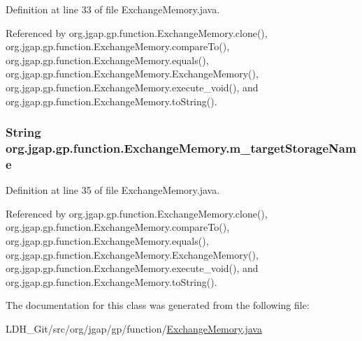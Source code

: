 Definition at line 33 of file Exchange\-Memory.\-java.



Referenced by org.\-jgap.\-gp.\-function.\-Exchange\-Memory.\-clone(), org.\-jgap.\-gp.\-function.\-Exchange\-Memory.\-compare\-To(), org.\-jgap.\-gp.\-function.\-Exchange\-Memory.\-equals(), org.\-jgap.\-gp.\-function.\-Exchange\-Memory.\-Exchange\-Memory(), org.\-jgap.\-gp.\-function.\-Exchange\-Memory.\-execute\-\_\-void(), and org.\-jgap.\-gp.\-function.\-Exchange\-Memory.\-to\-String().

\hypertarget{classorg_1_1jgap_1_1gp_1_1function_1_1_exchange_memory_aa65bd98ffa825ffc64636d27227c7d51}{
\subsubsection[{m\-\_\-target\-Storage\-Name}]{\setlength{\rightskip}{0pt plus 5cm}String org.\-jgap.\-gp.\-function.\-Exchange\-Memory.\-m\-\_\-target\-Storage\-Name\hspace{0.3cm}{\ttfamily [private]}}}\label{classorg_1_1jgap_1_1gp_1_1function_1_1_exchange_memory_aa65bd98ffa825ffc64636d27227c7d51}


Definition at line 35 of file Exchange\-Memory.\-java.



Referenced by org.\-jgap.\-gp.\-function.\-Exchange\-Memory.\-clone(), org.\-jgap.\-gp.\-function.\-Exchange\-Memory.\-compare\-To(), org.\-jgap.\-gp.\-function.\-Exchange\-Memory.\-equals(), org.\-jgap.\-gp.\-function.\-Exchange\-Memory.\-Exchange\-Memory(), org.\-jgap.\-gp.\-function.\-Exchange\-Memory.\-execute\-\_\-void(), and org.\-jgap.\-gp.\-function.\-Exchange\-Memory.\-to\-String().



The documentation for this class was generated from the following file\-:\begin{DoxyCompactItemize}
\item 
L\-D\-H\-\_\-\-Git/src/org/jgap/gp/function/\hyperlink{_exchange_memory_8java}{Exchange\-Memory.\-java}\end{DoxyCompactItemize}

